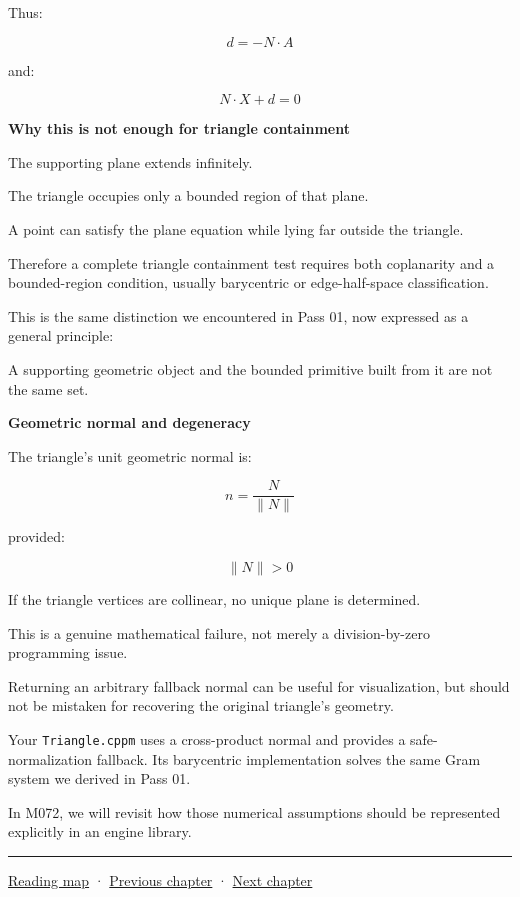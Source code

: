 Thus:

\[
d=-N\cdot A
\]

and:

\[
\boxed{ N\cdot X+d=0 }
\]

\textbf{Why this is not enough for triangle containment}

The supporting plane extends infinitely.

The triangle occupies only a bounded region of that plane.

A point can satisfy the plane equation while lying far outside the triangle.

Therefore a complete triangle containment test requires both coplanarity and a bounded-region condition, usually barycentric or edge-half-space classification.

This is the same distinction we encountered in Pass 01, now expressed as a general principle:

A supporting geometric object and the bounded primitive built from it are not the same set.

\textbf{Geometric normal and degeneracy}

The triangle's unit geometric normal is:

\[
n=\frac{N}{\|N\|}
\]

provided:

\[
\|N\|>0
\]

If the triangle vertices are collinear, no unique plane is determined.

This is a genuine mathematical failure, not merely a division-by-zero programming issue.

Returning an arbitrary fallback normal can be useful for visualization, but should not be mistaken for recovering the original triangle's geometry.

Your \texttt{Triangle.cppm} uses a cross-product normal and provides a safe-normalization fallback. Its barycentric implementation solves the same Gram system we derived in Pass 01.

In M072, we will revisit how those numerical assumptions should be represented explicitly in an engine library.

\begin{center}\rule{0.5\linewidth}{0.5pt}\end{center}

\hyperref[volume-reading-map]{Reading map} · \hyperref[03-visual-computing-i-ch021-collision-implementations-and-repository-comparison]{Previous chapter} · \hyperref[04-visual-computing-ii-ch023-mesh-topology-and-connectivity]{Next chapter}
